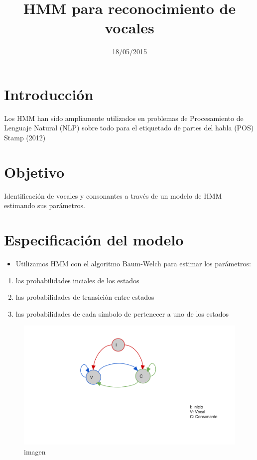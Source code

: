 \documentclass[]{article}
\title{HMM para reconocimiento de vocales}
\author{}
\date{18/05/2015}
\begin{document}
\maketitle


{
\hypersetup{linkcolor=black}
\setcounter{tocdepth}{2}
\tableofcontents
}
\pagebreak

\section{Introducción}\label{introduccion}

Los HMM han sido ampliamente utilizados en problemas de Procesamiento de
Lenguaje Natural (NLP) sobre todo para el etiquetado de partes del habla
(POS) Stamp (2012)

\section{Objetivo}\label{objetivo}

Identificación de vocales y consonantes a través de un modelo de HMM
estimando sus parámetros.

\section{Especificación del modelo}\label{especificacion-del-modelo}

\begin{itemize}
\itemsep1pt\parskip0pt
\item
  Utilizamos HMM con el algoritmo Baum-Welch para estimar los
  parámetros:
\end{itemize}

\begin{enumerate}
\def\labelenumi{\arabic{enumi}.}
\itemsep1pt\parskip0pt
\item
  las probabilidades inciales de los estados
\item
  las probabilidades de transición entre estados
\item
  las probabilidades de cada símbolo de pertenecer a uno de los estados
\end{enumerate}

\begin{figure}[htbp]
\centering
\includegraphics{modelo_vocales.png}
\caption{imagen}
\end{figure}
\end{document}
